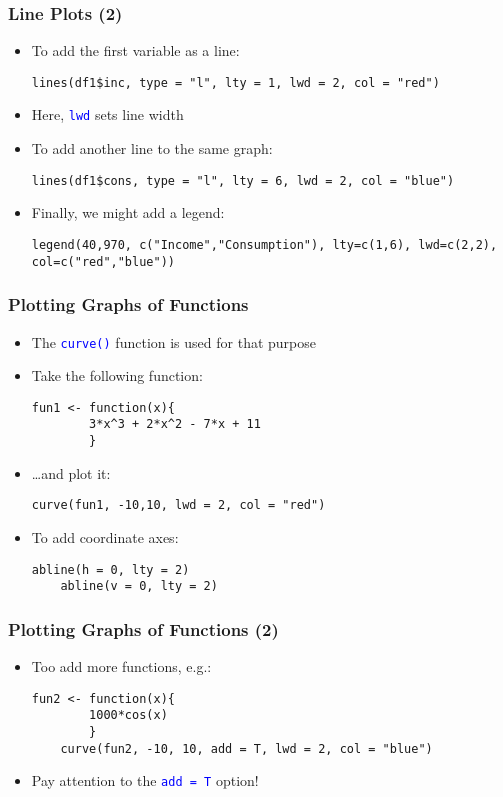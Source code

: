 \documentclass[10pt]{beamer}
\newcommand{\cc}[1]{\texttt{\textcolor{blue}{#1}}}
\theoremstyle{definition}
\begin{document}
\begin{frame}[fragile]
\frametitle{Line Plots (2)}
\begin{itemize}
	\item To add the first variable as a line:
	\begin{lstlisting}[style = rstyle, breaklines]
	lines(df1$inc, type = "l", lty = 1, lwd = 2, col = "red")
	\end{lstlisting}
	\item Here, \cc{lwd} sets line width
	\item To add another line to the same graph:
	\begin{lstlisting}[style = rstyle, breaklines]
	lines(df1$cons, type = "l", lty = 6, lwd = 2, col = "blue")
	\end{lstlisting}
	\item Finally, we might add a legend:
	\begin{lstlisting}[style = rstyle, breaklines]
	legend(40,970, c("Income","Consumption"), lty=c(1,6), lwd=c(2,2), col=c("red","blue"))
	\end{lstlisting}
\end{itemize}
\end{frame}

\begin{frame}[fragile]
\frametitle{Plotting Graphs of Functions}
\begin{itemize}
	\item The \cc{curve()} function is used for that purpose
	\item Take the following function:
	\begin{lstlisting}[style = rstyle, breaklines]
	fun1 <- function(x){
		3*x^3 + 2*x^2 - 7*x + 11
		}
	\end{lstlisting}
	\item \ldots and plot it:
	\begin{lstlisting}[style = rstyle, breaklines]
	curve(fun1, -10,10, lwd = 2, col = "red")
	\end{lstlisting}
	\item To add coordinate axes:
	\begin{lstlisting}[style = rstyle, breaklines]
	abline(h = 0, lty = 2)
	abline(v = 0, lty = 2)			
	\end{lstlisting}	
\end{itemize}
\end{frame}

\begin{frame}[fragile]
\frametitle{Plotting Graphs of Functions (2)}
\begin{itemize}
	\item Too add more functions, e.g.:
	\begin{lstlisting}[style = rstyle, breaklines]
	fun2 <- function(x){
		1000*cos(x)
		}
	curve(fun2, -10, 10, add = T, lwd = 2, col = "blue")
	\end{lstlisting}
	\item Pay attention to the \cc{add = T} option!
\end{itemize}
\end{frame}
\end{document}
